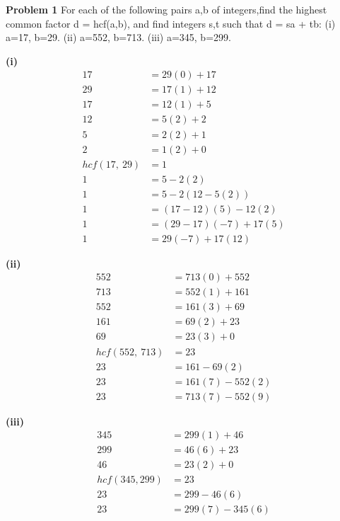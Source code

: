 \documentclass[12pt,letterpaper]{hmcpset}
\begin{document}
\begin{problem}
\textbf{Problem 1} For each of the following pairs a,b of integers,find the highest common factor d = hcf(a,b), and find integers s,t such that d = sa + tb:
\newline(i) a=17, b=29. 
\newline(ii) a=552, b=713. 
\newline(iii) a=345, b=299.
\end{problem}

\begin{solution}
\textbf{(i)}
\begin{align*}
17	&= 29(0) + 17	\\
29	&= 17(1) + 12	\\
17	&= 12(1) + 5		\\
12	&= 5(2) + 2		\\
5	&= 2(2) + 1		\\
2	&= 1(2) + 0		\\
hcf(17,\ 29)&= \boxed{1}	\\
1	&=5 - 2(2)	\\
1	&=5 - 2(12 - 5(2))	\\
1	&=	(17-12)(5) - 12(2)\\
1	&= (29-17)(-7)+17(5)	\\
1	&= \boxed{29(-7)+17(12)}
\end{align*}
\end{solution}

\begin{solution}
\textbf{(ii)}
\begin{align*}
552	&= 713(0) + 552	\\
713	&= 552(1) + 161 	\\
552	&= 161(3) + 69	\\
161	&= 69(2) + 23	\\
69	&= 23(3) + 0		\\
hcf(552,\ 713)&=\boxed{23}	\\
23	&= 161 - 69(2)	\\
23	&= 161(7) - 552(2)	\\
23	&= \boxed{713(7) - 552(9)}
\end{align*}

\end{solution}

\begin{solution}
\textbf{(iii)}
\begin{align*}
345	&= 299(1) + 46	\\
299	&= 46(6) + 23	\\
46	&= 23(2) + 0		\\
hcf(345, 299) &= \boxed{23}	\\
23	&= 299 - 46(6)	\\
23	&= \boxed{299(7) - 345(6)}
\end{align*}

\end{solution}
\end{document}
